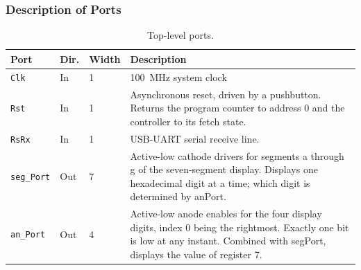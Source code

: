 \documentclass[11pt,letterpaper]{article}
\begin{document}
\subsubsection{Description of Ports}
\begin{table}[H]
  \centering
  \small
  \begin{tabular}{@{}lllp{}@{}}
    \toprule
    \textbf{Port} & \textbf{Dir.} & \textbf{Width} & \textbf{Description} \\
    \midrule
    \texttt{Clk}             & In  & 1  & 100~MHz system clock \\
    \texttt{Rst}           & In  & 1  & Asynchronous reset, driven by a pushbutton. Returns the program counter to address 0 and the controller to its fetch state.    \\
    \texttt{RsRx} & In & 1 & USB-UART serial receive line. \\
    \texttt{seg\_Port} & Out & 7 & Active-low cathode drivers for segments a through g of the seven-segment display. Displays one hexadecimal digit at a time; which digit is determined by anPort.\\
    \texttt{an\_Port} & Out & 4 & Active-low anode enables for the four display digits, index 0 being the rightmost. Exactly one bit is low at any instant. Combined with segPort, displays the value of register 7. \\
    
    
    \bottomrule
  \end{tabular}
  \caption{Top-level ports.}
\end{table}
\end{document}

